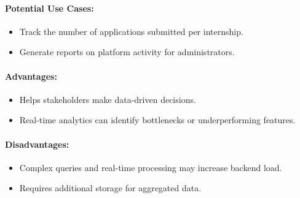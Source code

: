 \paragraph{Potential Use Cases:}
\begin{itemize}
    \item Track the number of applications submitted per internship.
    \item Generate reports on platform activity for administrators.
\end{itemize}

\paragraph{Advantages:}
\begin{itemize}
    \item Helps stakeholders make data-driven decisions.
    \item Real-time analytics can identify bottlenecks or underperforming features.
\end{itemize}

\paragraph{Disadvantages:}
\begin{itemize}
    \item Complex queries and real-time processing may increase backend load.
    \item Requires additional storage for aggregated data.
\end{itemize}
